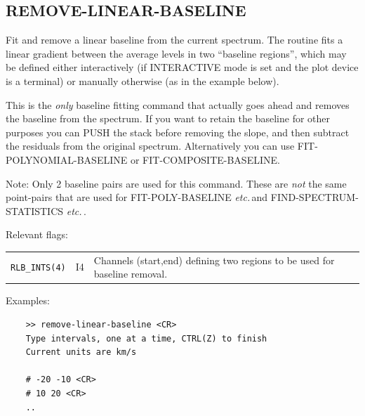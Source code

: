 \documentclass[11pt,twoside]{report}
\newcommand{\etc}{{\it etc.\,}}
\begin{document}
\subsection{REMOVE-LINEAR-BASELINE} 

Fit and remove a linear baseline from the current spectrum. The routine
fits a linear gradient between the average levels in two ``baseline regions'',
which may be defined either interactively (if INTERACTIVE mode is set and the
plot device is a terminal) or manually otherwise (as in the example below).

This is the {\em only} baseline fitting command that actually goes ahead
and removes the baseline from the spectrum. If you want to retain the
baseline for other purposes you can PUSH the stack before removing the
slope, and then subtract the residuals from the original spectrum. 
Alternatively you can use FIT-POLYNOMIAL-BASELINE or FIT-COMPOSITE-BASELINE.
 

Note: Only 2 baseline pairs are used for this command. These are {\em not} the
same point-pairs that are used for FIT-POLY-BASELINE \etc and
FIND-SPECTRUM-STATISTICS \etc.

Relevant flags:\\
\begin{tabular}{lll}
  \verb+RLB_INTS(4)+ & I4 & \parbox[t]{4in}
                            {Channels (start,end) defining two regions
                             to be used for baseline removal.}
\end{tabular}

Examples:
\begin{verbatim}
    >> remove-linear-baseline <CR>
    Type intervals, one at a time, CTRL(Z) to finish
    Current units are km/s  

    # -20 -10 <CR>
    # 10 20 <CR>
    ..
\end{verbatim}
\end{document}
